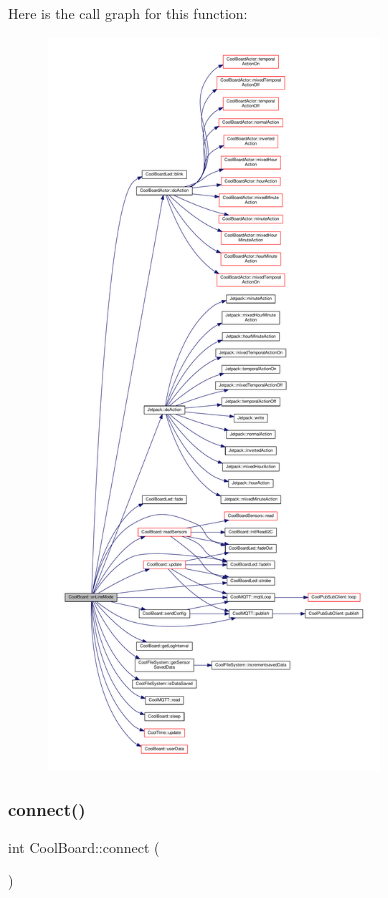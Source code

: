 Here is the call graph for this function\+:
\nopagebreak
\begin{figure}[H]
\begin{center}
\leavevmode
\includegraphics[height=550pt]{d7/df9/class_cool_board_aa0bbc4bc605e35618d18e68795c61363_cgraph}
\end{center}
\end{figure}
\mbox{\label{class_cool_board_a519de78b807f8ec6463ff484eb925918}} 
\subsubsection{\texorpdfstring{connect()}{connect()}}
{\footnotesize\ttfamily int Cool\+Board\+::connect (\begin{DoxyParamCaption}{ }\end{DoxyParamCaption})}

